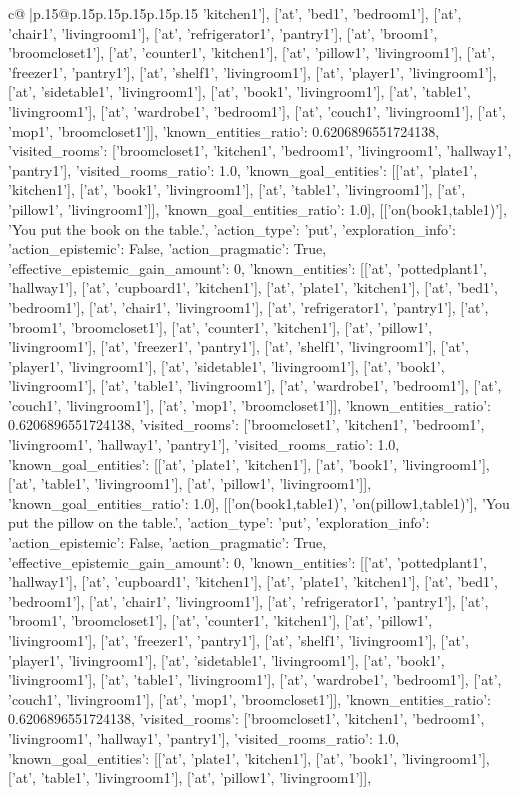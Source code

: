 \documentclass{article}
\begin{document}
{\begin{supertabular}{c@{$\;$}|p{.15\linewidth}@{}p{.15\linewidth}p{.15\linewidth}p{.15\linewidth}p{.15\linewidth}p{.15\linewidth}}
{{{'kitchen1'], ['at', 'bed1', 'bedroom1'], ['at', 'chair1', 'livingroom1'], ['at', 'refrigerator1', 'pantry1'], ['at', 'broom1', 'broomcloset1'], ['at', 'counter1', 'kitchen1'], ['at', 'pillow1', 'livingroom1'], ['at', 'freezer1', 'pantry1'], ['at', 'shelf1', 'livingroom1'], ['at', 'player1', 'livingroom1'], ['at', 'sidetable1', 'livingroom1'], ['at', 'book1', 'livingroom1'], ['at', 'table1', 'livingroom1'], ['at', 'wardrobe1', 'bedroom1'], ['at', 'couch1', 'livingroom1'], ['at', 'mop1', 'broomcloset1']], 'known_entities_ratio': 0.6206896551724138, 'visited_rooms': ['broomcloset1', 'kitchen1', 'bedroom1', 'livingroom1', 'hallway1', 'pantry1'], 'visited_rooms_ratio': 1.0, 'known_goal_entities': [['at', 'plate1', 'kitchen1'], ['at', 'book1', 'livingroom1'], ['at', 'table1', 'livingroom1'], ['at', 'pillow1', 'livingroom1']], 'known_goal_entities_ratio': 1.0}}], [['on(book1,table1)'], 'You put the book on the table.', {'action_type': 'put', 'exploration_info': {'action_epistemic': False, 'action_pragmatic': True, 'effective_epistemic_gain_amount': 0, 'known_entities': [['at', 'pottedplant1', 'hallway1'], ['at', 'cupboard1', 'kitchen1'], ['at', 'plate1', 'kitchen1'], ['at', 'bed1', 'bedroom1'], ['at', 'chair1', 'livingroom1'], ['at', 'refrigerator1', 'pantry1'], ['at', 'broom1', 'broomcloset1'], ['at', 'counter1', 'kitchen1'], ['at', 'pillow1', 'livingroom1'], ['at', 'freezer1', 'pantry1'], ['at', 'shelf1', 'livingroom1'], ['at', 'player1', 'livingroom1'], ['at', 'sidetable1', 'livingroom1'], ['at', 'book1', 'livingroom1'], ['at', 'table1', 'livingroom1'], ['at', 'wardrobe1', 'bedroom1'], ['at', 'couch1', 'livingroom1'], ['at', 'mop1', 'broomcloset1']], 'known_entities_ratio': 0.6206896551724138, 'visited_rooms': ['broomcloset1', 'kitchen1', 'bedroom1', 'livingroom1', 'hallway1', 'pantry1'], 'visited_rooms_ratio': 1.0, 'known_goal_entities': [['at', 'plate1', 'kitchen1'], ['at', 'book1', 'livingroom1'], ['at', 'table1', 'livingroom1'], ['at', 'pillow1', 'livingroom1']], 'known_goal_entities_ratio': 1.0}}], [['on(book1,table1)', 'on(pillow1,table1)'], 'You put the pillow on the table.', {'action_type': 'put', 'exploration_info': {'action_epistemic': False, 'action_pragmatic': True, 'effective_epistemic_gain_amount': 0, 'known_entities': [['at', 'pottedplant1', 'hallway1'], ['at', 'cupboard1', 'kitchen1'], ['at', 'plate1', 'kitchen1'], ['at', 'bed1', 'bedroom1'], ['at', 'chair1', 'livingroom1'], ['at', 'refrigerator1', 'pantry1'], ['at', 'broom1', 'broomcloset1'], ['at', 'counter1', 'kitchen1'], ['at', 'pillow1', 'livingroom1'], ['at', 'freezer1', 'pantry1'], ['at', 'shelf1', 'livingroom1'], ['at', 'player1', 'livingroom1'], ['at', 'sidetable1', 'livingroom1'], ['at', 'book1', 'livingroom1'], ['at', 'table1', 'livingroom1'], ['at', 'wardrobe1', 'bedroom1'], ['at', 'couch1', 'livingroom1'], ['at', 'mop1', 'broomcloset1']], 'known_entities_ratio': 0.6206896551724138, 'visited_rooms': ['broomcloset1', 'kitchen1', 'bedroom1', 'livingroom1', 'hallway1', 'pantry1'], 'visited_rooms_ratio': 1.0, 'known_goal_entities': [['at', 'plate1', 'kitchen1'], ['at', 'book1', 'livingroom1'], ['at', 'table1', 'livingroom1'], ['at', 'pillow1', 'livingroom1']], }}}
\end{supertabular}}
\end{document}
